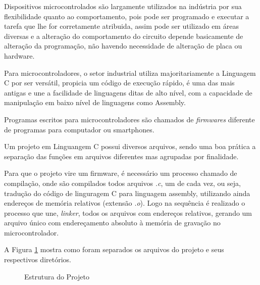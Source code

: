 Dispositivos microcontrolados são largamente utilizados na indústria por sua flexibilidade quanto ao comportamento, pois pode ser programado e executar a tarefa que lhe for corretamente atribuida, assim pode ser utilizado em áreas diversas e a alteração do comportamento do circuito depende basicamente de alteração da programação, não havendo necessidade de alteração de placa ou hardware. 

Para microcontroladores, o setor industrial utiliza majoritariamente a Linguagem C por ser versátil, propicia um código de execução rápido, é uma das mais antigas e une a facilidade de linguagens ditas de alto nível, com a capacidade de manipulação em baixo nível de linguagens como Assembly. 

Programas escritos para microcontroladores são chamados de \emph{firmwares} diferente de programas para computador ou smartphones. 

Um projeto em Linguangem C possui diversos arquivos, sendo uma boa prática a separação das funções em arquivos diferentes mas agrupadas por finalidade. 

Para que o projeto vire um firmware, é necessário um processo chamado de compilação, onde são compilados todos arquivos \emph{.c}, um de cada vez, ou seja, tradução do código de linguragem C para linguagem assembly, utilizando ainda endereços de memória relativos (extensão \emph{.o}). Logo na sequência é realizado o processo que une, \emph{linker}, todos os arquivos com endereços relativos, gerando um arquivo único com endereçamento absoluto à memória de gravação no microcontrolador. 

A Figura \ref{fig:estruturaProjeto} mostra como foram separados os arquivos do projeto e seus respectivos diretórios. 


\begin{figure}[!htb]
\centering
{}
\caption{ Estrutura do Projeto}
\label{fig:estruturaProjeto}
\end{figure}


